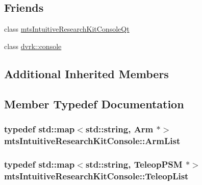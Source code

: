 \subsection*{Friends}
\begin{DoxyCompactItemize}
\item 
class \hyperlink{classmts_intuitive_research_kit_console_a9cbd14ff7aa15c6b787a1640dd0a598b}{mts\-Intuitive\-Research\-Kit\-Console\-Qt}
\item 
class \hyperlink{classmts_intuitive_research_kit_console_a30eecdaed2d925aff1a8ca2341429a2d}{dvrk\-::console}
\end{DoxyCompactItemize}
\subsection*{Additional Inherited Members}


\subsection{Member Typedef Documentation}
\hypertarget{classmts_intuitive_research_kit_console_a73791e1c46d037b4eff9e89a5a7115dc}{
\subsubsection[{Arm\-List}]{\setlength{\rightskip}{0pt plus 5cm}typedef std\-::map$<$std\-::string, {\bf Arm} $\ast$$>$ {\bf mts\-Intuitive\-Research\-Kit\-Console\-::\-Arm\-List}\hspace{0.3cm}{\ttfamily [protected]}}}\label{classmts_intuitive_research_kit_console_a73791e1c46d037b4eff9e89a5a7115dc}
\hypertarget{classmts_intuitive_research_kit_console_ac8742419cdc8c2eaa6889dcf81d08cc5}{
\subsubsection[{Teleop\-List}]{\setlength{\rightskip}{0pt plus 5cm}typedef std\-::map$<$std\-::string, {\bf Teleop\-P\-S\-M} $\ast$$>$ {\bf mts\-Intuitive\-Research\-Kit\-Console\-::\-Teleop\-List}\hspace{0.3cm}{\ttfamily [protected]}}}\label{classmts_intuitive_research_kit_console_ac8742419cdc8c2eaa6889dcf81d08cc5}


